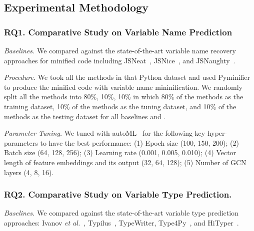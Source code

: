 \subsection{Experimental Methodology}
\label{empirical-method}

\subsubsection{RQ1. Comparative Study on Variable Name Prediction\\}
{\em Baselines.} We compared {\tool} against the state-of-the-art
variable name recovery approaches for minified code including
JSNeat~\cite{tran2019recovering}, JSNice~\cite{JSNice2015}, and
JSNaughty~\cite{JSNaughty2017}.

\textit{Procedure.} We took all the methods in that Python dataset
and used Pyminifier to produce the minified code with variable name
mininification. We randomly split all the methods into 80\%, 10\%,
10\% in which 80\% of the methods as the training dataset, 10\% of the
methods as the tuning dataset, and 10\% of the methods as the testing
dataset for all baselines and {\tool}.


{\em Parameter Tuning.} We tuned {\tool} with autoML~\cite{NNI} for
the following key hyper-parameters to have the best performance: (1)
Epoch size (100, 150, 200); (2) Batch size (64, 128, 256); (3)
Learning rate (0.001, 0.005, 0.010); (4) Vector length of feature
embeddings and its output (32, 64, 128); (5) Number of GCN layers (4,
8, 16).

\subsubsection{RQ2. Comparative Study on Variable Type Prediction.}

{\em Baselines.} We compared {\tool} against the state-of-the-art
  variable type prediction approaches: Ivanov {\em et
  al.}~\cite{ivanov21predicting}, Typilus~\cite{typilus-pldi20},
  TypeWriter\cite{typewriter-fse20}, Type4Py~\cite{Type4Py-icse22},
  and HiTyper~\cite{HiTyper-icse22}.

